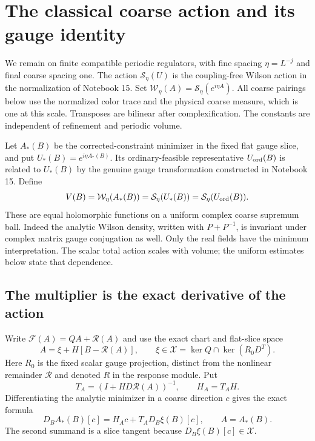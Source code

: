 
\section{The classical coarse action and its gauge identity}
\label{ca-section}

We remain on finite compatible periodic regulators, with fine
spacing $\eta=L^{-j}$ and final coarse spacing one. The action
$\mathcal S_\eta(U)$ is the coupling-free Wilson action in the
normalization of Notebook 15. Set
$\mathcal W_\eta(A)=\mathcal S_\eta(e^{i\eta A})$.
All coarse pairings below use the normalized color trace and
the physical coarse measure, which is one at this scale.
Transposes are bilinear after complexification. The constants
are independent of refinement and periodic volume.

Let $A_*(B)$ be the corrected-constraint minimizer in the fixed
flat gauge slice, and put $U_*(B)=e^{i\eta A_*(B)}$. Its
ordinary-feasible representative $U_{\rm ord}(B)$ is related
to $U_*(B)$ by the genuine gauge transformation constructed in
Notebook 15. Define
\begin{equation}\label{ca-definition}
 V(B)=\mathcal W_\eta(A_*(B))
     =\mathcal S_\eta(U_*(B))
     =\mathcal S_\eta(U_{\rm ord}(B)).
\end{equation}
These are equal holomorphic functions on a uniform complex
coarse supremum ball. Indeed the analytic Wilson density,
written with $P+P^{-1}$, is invariant under complex matrix
gauge conjugation as well. Only the real fields have the
minimum interpretation. The scalar total action scales with
volume; the uniform estimates below state that dependence.

\subsection{The multiplier is the exact derivative of the action}
\label{ca-envelope-section}

Write $\mathcal F(A)=QA+\mathcal R(A)$ and use the exact
chart and flat-slice space
\[
 A=\xi+H[B-\mathcal R(A)],\qquad
 \xi\in\mathcal X=\ker Q\cap\ker(R_0D^T).
\]
Here $R_0$ is the fixed scalar gauge projection, distinct from
the nonlinear remainder $\mathcal R$ and denoted $R$ in the
response module. Put
\begin{equation}\label{ca-chart-differential}
 T_A=(I+HD\mathcal R(A))^{-1},\qquad H_A=T_AH.
\end{equation}
Differentiating the analytic minimizer in a coarse direction $c$
gives the exact formula
\begin{equation}\label{ca-response-decomposition}
 D_BA_*(B)[c]=H_Ac+T_AD_B\xi(B)[c],\qquad A=A_*(B).
\end{equation}
The second summand is a slice tangent because
$D_B\xi(B)[c]\in\mathcal X$.

